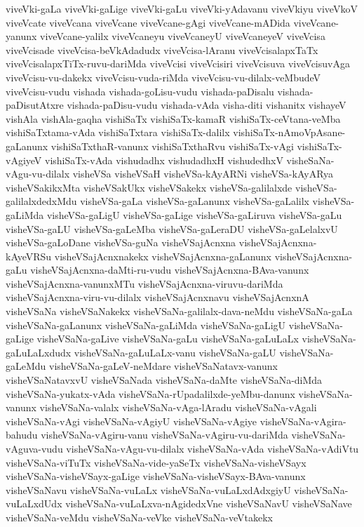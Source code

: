{viveVki-gaLa
viveVki-gaLige
viveVki-gaLu
viveVki-yAdavanu
viveVkiyu
viveVkoV
viveVcate
viveVcana
viveVcane
viveVcane-gAgi
viveVcane-mADida
viveVcane-yanunx
viveVcane-yalilx
viveVcaneyu
viveVcaneyU
viveVcaneyeV
viveVcisa
viveVcisade
viveVcisa-beVkAdadudx
viveVcisa-lAranu
viveVcisalapxTaTx
viveVcisalapxTiTx-ruvu-dariMda
viveVcisi
viveVcisiri
viveVcisuva
viveVcisuvAga
viveVcisu-vu-dakekx
viveVcisu-vuda-riMda
viveVcisu-vu-dilalx-veMbudeV
viveVcisu-vudu
vishada
vishada-goLisu-vudu
vishada-paDisalu
vishada-paDisutAtxre
vishada-paDisu-vudu
vishada-vAda
visha-diti
vishanitx
vishayeV
vishAla
vishAla-gaqha
vishiSaTx
vishiSaTx-kamaR
vishiSaTx-ceVtana-veMba
vishiSaTxtama-vAda
vishiSaTxtara
vishiSaTx-dalilx
vishiSaTx-nAmoVpAsane-gaLanunx
vishiSaTxthaR-vanunx
vishiSaTxthaRvu
vishiSaTx-vAgi
vishiSaTx-vAgiyeV
vishiSaTx-vAda
vishudadhx
vishudadhxH
vishudedhxV
visheSaNa-vAgu-vu-dilalx
visheVSa
visheVSaH
visheVSa-kAyARNi
visheVSa-kAyARya
visheVSakikxMta
visheVSakUkx
visheVSakekx
visheVSa-galilalxde
visheVSa-galilalxdedxMdu
visheVSa-gaLa
visheVSa-gaLanunx
visheVSa-gaLalilx
visheVSa-gaLiMda
visheVSa-gaLigU
visheVSa-gaLige
visheVSa-gaLiruva
visheVSa-gaLu
visheVSa-gaLU
visheVSa-gaLeMba
visheVSa-gaLeraDU
visheVSa-gaLelalxvU
visheVSa-gaLoDane
visheVSa-guNa
visheVSajAcnxna
visheVSajAcnxna-kAyeVRSu
visheVSajAcnxnakekx
visheVSajAcnxna-gaLanunx
visheVSajAcnxna-gaLu
visheVSajAcnxna-daMti-ru-vudu
visheVSajAcnxna-BAva-vanunx
visheVSajAcnxna-vanunxMTu
visheVSajAcnxna-viruvu-dariMda
visheVSajAcnxna-viru-vu-dilalx
visheVSajAcnxnavu
visheVSajAcnxnA
visheVSaNa
visheVSaNakekx
visheVSaNa-galilalx-dava-neMdu
visheVSaNa-gaLa
visheVSaNa-gaLanunx
visheVSaNa-gaLiMda
visheVSaNa-gaLigU
visheVSaNa-gaLige
visheVSaNa-gaLive
visheVSaNa-gaLu
visheVSaNa-gaLuLaLx
visheVSaNa-gaLuLaLxdudx
visheVSaNa-gaLuLaLx-vanu
visheVSaNa-gaLU
visheVSaNa-gaLeMdu
visheVSaNa-gaLeV-neMdare
visheVSaNatavx-vanunx
visheVSaNatavxvU
visheVSaNada
visheVSaNa-daMte
visheVSaNa-diMda
visheVSaNa-yukatx-vAda
visheVSaNa-rUpadalilxde-yeMbu-danunx
visheVSaNa-vanunx
visheVSaNa-valalx
visheVSaNa-vAga-lAradu
visheVSaNa-vAgali
visheVSaNa-vAgi
visheVSaNa-vAgiyU
visheVSaNa-vAgiye
visheVSaNa-vAgira-bahudu
visheVSaNa-vAgiru-vanu
visheVSaNa-vAgiru-vu-dariMda
visheVSaNa-vAguva-vudu
visheVSaNa-vAgu-vu-dilalx
visheVSaNa-vAda
visheVSaNa-vAdiVtu
visheVSaNa-viTuTx
visheVSaNa-vide-yaSeTx
visheVSaNa-visheVSayx
visheVSaNa-visheVSayx-gaLige
visheVSaNa-visheVSayx-BAva-vanunx
visheVSaNavu
visheVSaNa-vuLaLx
visheVSaNa-vuLaLxdAdxgiyU
visheVSaNa-vuLaLxdUdx
visheVSaNa-vuLaLxva-nAgidedxVne
visheVSaNavU
visheVSaNave
visheVSaNa-veMdu
visheVSaNa-veVke
visheVSaNa-veVtakekx
}
